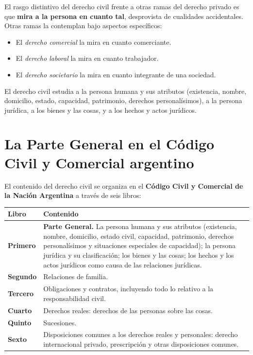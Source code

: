 \documentclass[12pt, a4paper]{report}
\begin{document}
\begin{important}
El rasgo distintivo del derecho civil frente a otras ramas del derecho privado
es que \textbf{mira a la persona en cuanto tal}, desprovista de cualidades
accidentales. Otras ramas la contemplan bajo aspectos específicos:
\begin{itemize}
  \item El \textit{derecho comercial} la mira en cuanto comerciante.
  \item El \textit{derecho laboral} la mira en cuanto trabajador.
  \item El \textit{derecho societario} la mira en cuanto integrante de una
        sociedad.
\end{itemize}
El derecho civil estudia a la persona humana y sus atributos (existencia,
nombre, domicilio, estado, capacidad, patrimonio, derechos personalísimos),
a la persona jurídica, a los bienes y las cosas, y a los hechos y actos
jurídicos.
\end{important}

\section{La Parte General en el Código Civil y Comercial argentino}

El contenido del derecho civil se organiza en el \textbf{Código Civil y
Comercial de la Nación Argentina} a través de seis libros:

\vspace{4pt}
\begin{center}
\begin{tabular}{C{1.8cm} L{11.5cm}}
\toprule
\textbf{Libro} & \textbf{Contenido} \\
\midrule
\textbf{Primero} &
  \textbf{Parte General.} La persona humana y sus atributos (existencia,
  nombre, domicilio, estado civil, capacidad, patrimonio, derechos
  personalísimos y situaciones especiales de capacidad); la persona jurídica y
  su clasificación; los bienes y las cosas; los hechos y los actos jurídicos
  como causa de las relaciones jurídicas. \\
\addlinespace
\textbf{Segundo} & Relaciones de familia. \\
\addlinespace
\textbf{Tercero} &
  Obligaciones y contratos, incluyendo todo lo relativo a la responsabilidad
  civil. \\
\addlinespace
\textbf{Cuarto} & Derechos reales: derechos de las personas sobre las cosas. \\
\addlinespace
\textbf{Quinto} & Sucesiones. \\
\addlinespace
\textbf{Sexto} &
  Disposiciones comunes a los derechos reales y personales: derecho
  internacional privado, prescripción y otras disposiciones comunes. \\
\bottomrule
\end{tabular}
\end{center}
\vspace{4pt}
\end{document}

